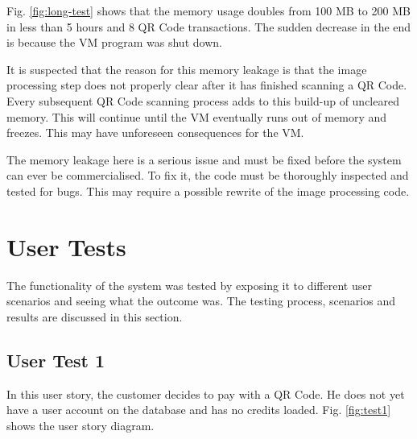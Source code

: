 Fig. \ref{fig:long-test} shows that the memory usage doubles from 100 MB to 200 MB in less
than 5 hours and 8 QR Code transactions. The sudden decrease in the end is because the VM
program was shut down. 

It is suspected that the reason for this memory leakage is that the image processing step
does not properly clear after it has finished scanning a QR Code. Every subsequent QR Code
scanning process adds to this build-up of uncleared memory. This will continue until the
VM eventually runs out of memory and freezes. This may have unforeseen consequences for
the VM. 

The memory leakage here is a serious issue and must be fixed before the system can ever be
commercialised. To fix it, the code must be thoroughly inspected and tested for bugs.
This may require a possible rewrite of the image processing code. 

\section{User Tests}

The functionality of the system was tested by exposing it to different user
scenarios and seeing what the outcome was. The testing process, scenarios and
results are discussed in this section.

\subsection{User Test 1}

In this user story, the customer decides to pay with a QR Code.
He does not yet have a user account on the database and has no credits loaded.
Fig. \ref{fig:test1} shows the user story diagram. 

